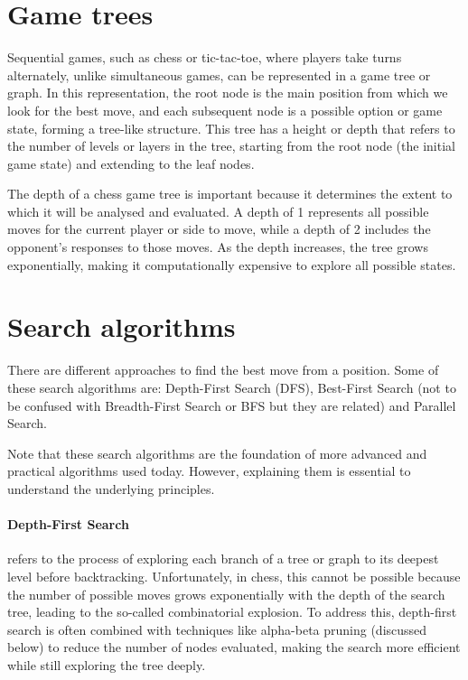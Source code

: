 \section{Game trees}

Sequential games, such as chess or tic-tac-toe, where players take turns alternately, unlike simultaneous games, can be represented in a game tree or graph. In this representation, the root node is the main position from which we look for the best move, and each subsequent node is a possible option or game state, forming a tree-like structure. This tree has a height or depth that refers to the number of levels or layers in the tree, starting from the root node (the initial game state) and extending to the leaf nodes.

\vspace{1em}

\noindent The depth of a chess game tree is important because it determines the extent to which it will be analysed and evaluated. A depth of 1 represents all possible moves for the current player or side to move, while a depth of 2 includes the opponent's responses to those moves. As the depth increases, the tree grows exponentially, making it computationally expensive to explore all possible states.

\section{Search algorithms}

There are different approaches to find the best move from a position. Some of these search algorithms are: Depth-First Search (DFS), Best-First Search (not to be confused with Breadth-First Search or BFS but they are related) and Parallel Search.

\vspace{1em}

\noindent Note that these search algorithms are the foundation of more advanced and practical algorithms used today. However, explaining them is essential to understand the underlying principles.

\paragraph{Depth-First Search} refers to the process of exploring each branch of a tree or graph to its deepest level before backtracking. Unfortunately, in chess, this cannot be possible because the number of possible moves grows exponentially with the depth of the search tree, leading to the so-called combinatorial explosion. To address this, depth-first search is often combined with techniques like alpha-beta pruning (discussed below) to reduce the number of nodes evaluated, making the search more efficient while still exploring the tree deeply.

